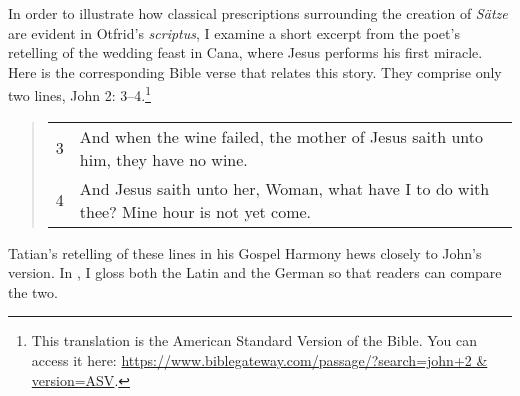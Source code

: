 In order to illustrate how classical prescriptions surrounding the creation of \textit{Sätze} are evident in Otfrid’s \textit{scriptus}, I examine a short excerpt from the poet’s retelling of the wedding feast in Cana, where Jesus performs his first miracle. Here is the corresponding Bible verse that relates this story. They comprise only two lines, John 2: 3--4.\footnote{{This translation is the American Standard Version of the Bible. You can access it here:} \url{https://www.biblegateway.com/passage/?search=john+2 & version=ASV}. }

\begin{quote}
\begin{tabularx}{\linewidth}{@{}lQ@{}}
3 & And when the wine failed, the mother of Jesus saith unto him, they have no wine.\\
4 & And Jesus saith unto her, Woman, what have I to do with thee? Mine hour is not yet come.
\end{tabularx}
\end{quote}

\noindent Tatian’s retelling of these lines in his Gospel Harmony hews closely to John’s version. In , I gloss both the Latin and the German so that readers can compare the two.

